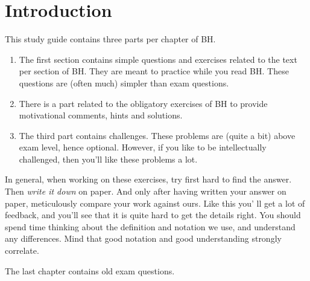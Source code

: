\chapter*{Introduction}
\label{sec:orgb865fed}

This study guide contains three parts per chapter of BH.
\begin{enumerate}
\item The first section contains simple questions and exercises related to the text per section of BH. They are meant to practice while you read BH. These questions are (often much) simpler than exam questions.
\item There is a part related to the obligatory exercises of BH to provide motivational comments, hints and solutions.
\item The third part contains challenges. These problems are (quite a bit) above exam level, hence optional. However, if you like to be  intellectually challenged, then you'll like these problems a lot.
\end{enumerate}

In general, when working on these exercises, try first hard to find the answer. Then \emph{write it down} on paper. And only after having written your answer on paper, meticulously compare your work against ours. Like this you' ll get a lot of feedback, and you'll see that it is quite hard to get the details right.
You should spend time thinking about the definition and notation we use, and understand any differences. Mind that good notation and good understanding strongly correlate.

The last chapter contains old exam questions.
